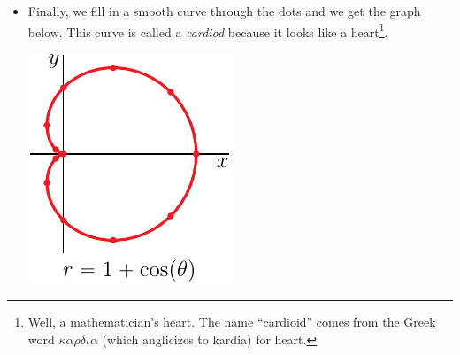 \begin{eg}
\begin{itemize}
\item
Finally, we fill in a smooth curve through the dots and we get the
graph below. This curve is called a \emph{cardiod} because it looks
like a heart\footnote{Well, a mathematician's heart. The name ``cardioid''
comes from the Greek word $\kappa \alpha \rho \delta \iota \alpha$
(which anglicizes to kardia) for heart.}.
\begin{efig}
\begin{center}
    \includegraphics{cardiodF.pdf}
\end{center}
\end{efig}
\end{itemize}
\end{eg}


